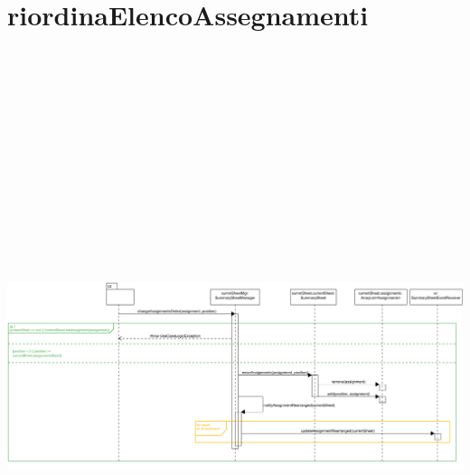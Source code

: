 \section{riordinaElencoAssegnamenti}
\centering\includegraphics[max width=\textwidth, max height=190mm]{../resources/img/GCC/DSD/op3.png}

